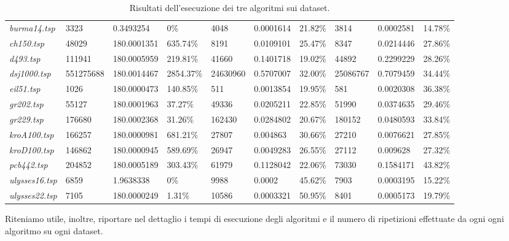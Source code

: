 \begin{landscape}
\begin{table}[]
\begin{tabular}{|l|l|l|l|l|l|l|l|l|l|}
  \textit{burma14.tsp} & 3323 & 0.3493254 & 0\% & 4048 & 0.0001614 & 21.82\% & 3814 & 0.0002581 & 14.78\% \\ 
  \textit{ch150.tsp} & 48029 & 180.0001351 & 635.74\% & 8191 & 0.0109101 & 25.47\% & 8347 & 0.0214446 & 27.86\% \\ 
  \textit{d493.tsp} & 111941 & 180.0005959 & 219.81\% & 41660 & 0.1401718 & 19.02\% & 44892 & 0.2299229 & 28.26\% \\ 
  \textit{dsj1000.tsp} & 551275688 & 180.0014467 & 2854.37\% & 24630960 & 0.5707007 & 32.00\% & 25086767 & 0.7079459 & 34.44\% \\ 
  \textit{eil51.tsp} & 1026 & 180.0000473 & 140.85\% & 511 & 0.0013854 & 19.95\% & 581 & 0.0020308 & 36.38\% \\ 
  \textit{gr202.tsp} & 55127 & 180.0001963 & 37.27\% & 49336 & 0.0205211 & 22.85\% & 51990 & 0.0374635 & 29.46\% \\ 
  \textit{gr229.tsp} & 176680 & 180.0002368 & 31.26\% & 162430 & 0.0284802 & 20.67\% & 180152 & 0.0480593 & 33.84\% \\ 
  \textit{kroA100.tsp} & 166257 & 180.0000981 & 681.21\% & 27807 & 0.004863 & 30.66\% & 27210 & 0.0076621 & 27.85\% \\ 
  \textit{kroD100.tsp} & 146862 & 180.0000945 & 589.69\% & 26947 & 0.0049283 & 26.55\% & 27112 & 0.009628 & 27.32\% \\ 
  \textit{pcb442.tsp} & 204852 & 180.0005189 & 303.43\% & 61979 & 0.1128042 & 22.06\% & 73030 & 0.1584171 & 43.82\% \\ 
  \textit{ulysses16.tsp} & 6859 & 1.9638338 & 0\% & 9988 & 0.0002 & 45.62\% & 7903 & 0.0003195 & 15.22\% \\ 
  \textit{ulysses22.tsp} & 7105 & 180.0000249 & 1.31\% & 10586 & 0.0003321 & 50.95\% & 8401 & 0.0005173 & 19.79\% \\ \hline
  \end{tabular}
  \caption{Risultati dell'esecuzione dei tre algoritmi sui dataset.}
  \label{tab:results}
  \end{table}
\end{landscape}


Riteniamo utile, inoltre, riportare nel dettaglio i tempi di esecuzione degli algoritmi e il numero di ripetizioni effettuate da ogni ogni algoritmo su ogni dataset.

